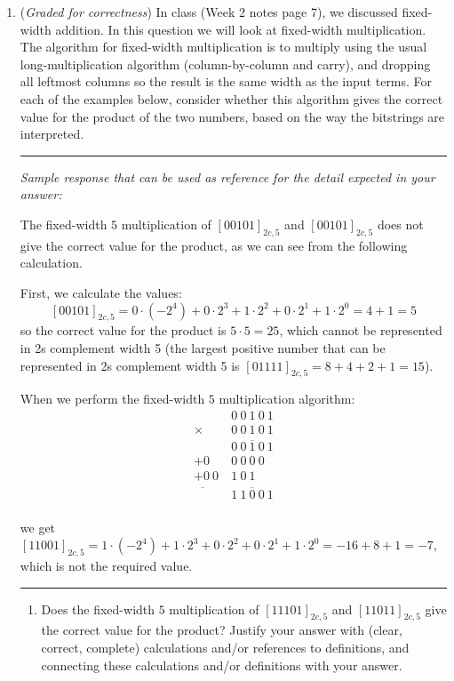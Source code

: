 \documentclass[12pt, oneside]{article}
\begin{document}
\begin{enumerate}
    \item ({\it Graded for correctness}) In class (Week 2 notes page 7), we discussed fixed-width addition. In this
    question we will look at fixed-width multiplication. The algorithm for fixed-width 
    multiplication is to multiply using the usual long-multiplication algorithm 
    (column-by-column and carry), and dropping all leftmost columns so the result is the same 
    width as the input terms. For each of the examples below, consider whether 
    this algorithm gives the correct value for the product of the two numbers, based on
    the way the bitstrings are interpreted.

    \rule{0.5\textwidth}{.4pt}

    {\it Sample response that can be used as reference for the detail expected 
    in your answer:} 
    
    The fixed-width $5$ multiplication of $[00101]_{2c,5}$ and $[00101]_{2c,5}$ 
    does not give the correct
    value for the product, as we can see from the following calculation.
    
    First, we calculate the values: 
    \[
        [00101]_{2c,5} = 0\cdot (-2^4) + 0\cdot 2^3 + 1 \cdot 2^2 + 0\cdot 2^1 + 1 \cdot 2^0 = 4 + 1 = 5
    \]
    so the correct value for the product is $5 \cdot 5 = 25$, which cannot be represented
    in 2s complement width 5 (the largest positive number that can be represented in 
    2s complement width 5 is $[01111]_{2c,5} = 8 + 4 + 2 + 1 = 15$).
    
    When we perform the fixed-width $5$ multiplication algorithm:
    \begin{align*}
            & 0~ 0~ 1~ 0~ 1\\
     \times & 0~ 0~ 1~ 0~ 1\\
     &\overline{0~ 0~ 1~ 0~ 1}\\
     + {0~} & {0~0~0~0~~}\\
     + {0~0~} & {1~0~1~~}\\
     \overline{\phantom{0~0~}}&\overline{1~ 1~ 0~ 0~ 1}\\
    \end{align*}

    we get $[11001]_{2c,5} = 1\cdot (-2^4) + 1 \cdot 2^3 + 0 \cdot 2^2 + 0 \cdot 2^1 + 1 \cdot 2^0 = -16 + 8 + 1 = -7$, 
    which is not the required value.

    \rule{0.5\textwidth}{.4pt}


    \begin{enumerate}
        \item Does the fixed-width $5$ multiplication of $[11101]_{2c,5}$ and 
        $[11011]_{2c,5}$ give the correct value for the product?
        Justify your answer  
        with (clear, correct, complete) calculations and/or references to definitions, 
        and connecting these
        calculations and/or definitions with
        your answer.
        

\end{enumerate}
\end{enumerate}
\end{document}

